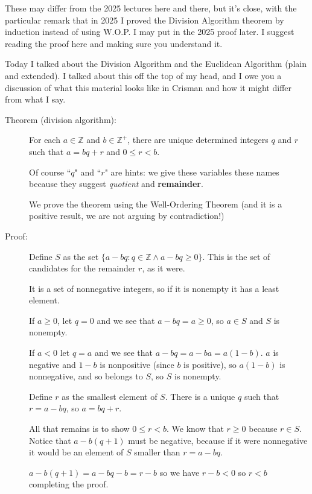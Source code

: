 \documentclass[12pt]{article}
\begin{document}
These may differ from the 2025 lectures here and there, but it's close, with the particular remark that in 2025 I proved the Division Algorithm theorem by induction instead of using W.O.P.  I may put in the 2025 proof later.  I suggest reading the proof here and making sure you understand it.

Today I talked about the Division Algorithm and the Euclidean Algorithm (plain and extended).  I talked about this off the top of my head, and I owe you a discussion of what this material looks like in Crisman and how it might differ from what I say.

\begin{description}

\item[Theorem (division algorithm):]  For each $a \in {\mathbb Z}$ and $b \in {\mathbb Z}^+$, there are unique determined integers $q$ and $r$ such that $a=bq+r$ and $0 \leq r <b$.

Of course ``$q$" and ``$r$" are hints:  we give these variables these names because they suggest {\em quotient\/} and {\bf remainder\/}.

We prove the theorem using the Well-Ordering Theorem (and it is a positive result, we are not arguing by contradiction!)

\item[Proof:]

Define $S$ as the set $\{a-bq:q \in {\mathbb Z} \wedge a-bq\geq 0\}$.  This is the set of candidates for the remainder $r$, as it were.

It is a set of nonnegative integers, so if it is nonempty it has a least element.

If $a\geq 0$, let $q=0$ and we see that $a-bq=a\geq 0$, so $a \in S$ and $S$ is nonempty.

If $a <0$ let $q=a$ and we see that $a-bq = a-ba=a(1-b)$.  $a$ is negative and $1-b$ is nonpositive (since $b$ is positive), so $a(1-b)$ is nonnegative, and so belongs to $S$, so $S$ is nonempty.

Define $r$ as the smallest element of $S$.  There is a unique $q$ such that $r=a-bq$, so $a=bq+r$.

All that remains is to show $0 \leq r<b$.  We know that $r \geq 0$ because $r \in S$.  Notice that $a-b(q+1)$ must be negative, because
if it were nonnegative it would be an element of $S$ smaller than $r=a-bq$.

$a-b(q+1) = a-bq-b=r-b$ so we have $r-b<0$ so $r<b$ completing the proof.


\end{description}
\end{document}
